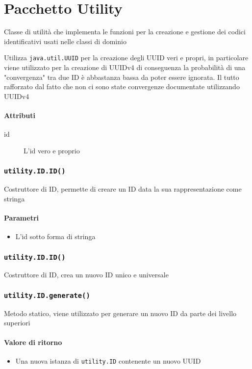 \section{Pacchetto Utility}
\label{sec:package_utility}
Classe di utilità che implementa le funzioni per la creazione e
gestione dei codici identificativi usati nelle classi di dominio

Utilizza \texttt{java.util.UUID} per la creazione degli UUID veri e
propri, in particolare viene utilizzato per la creazione di UUIDv4 di
conseguenza la probabilità di una "convergenza" tra due ID è
abbastanza bassa da poter essere ignorata. Il tutto rafforzato dal
fatto che non ci sono state convergenze documentate utilizzando UUIDv4

\paragraph{Attributi}
\begin{description}
\item[id] L'id vero e proprio
\end{description}

\subsubsection{\texttt{utility.ID.ID()}}
Costruttore di ID, permette di creare un ID data la sua
rappresentazione come stringa
\paragraph{Parametri}
\begin{itemize}
\item L'id sotto forma di stringa
\end{itemize}

\subsubsection{\texttt{utility.ID.ID()}}
Costruttore di ID, crea un nuovo ID unico e universale

\subsubsection{\texttt{utility.ID.generate()}}
Metodo statico, viene utilizzato per generare un nuovo ID da parte
dei livello superiori
\paragraph{Valore di ritorno}
\begin{itemize}
\item Una nuova istanza di \texttt{utility.ID} contenente un nuovo UUID
\end{itemize}

